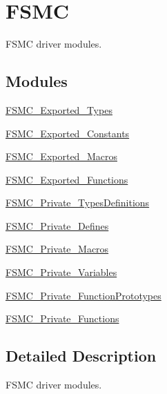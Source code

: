 \hypertarget{group___f_s_m_c}{}\section{F\+S\+MC}
\label{group___f_s_m_c}


F\+S\+MC driver modules.  


\subsection*{Modules}
\begin{DoxyCompactItemize}
\item 
\hyperlink{group___f_s_m_c___exported___types}{F\+S\+M\+C\+\_\+\+Exported\+\_\+\+Types}
\item 
\hyperlink{group___f_s_m_c___exported___constants}{F\+S\+M\+C\+\_\+\+Exported\+\_\+\+Constants}
\item 
\hyperlink{group___f_s_m_c___exported___macros}{F\+S\+M\+C\+\_\+\+Exported\+\_\+\+Macros}
\item 
\hyperlink{group___f_s_m_c___exported___functions}{F\+S\+M\+C\+\_\+\+Exported\+\_\+\+Functions}
\item 
\hyperlink{group___f_s_m_c___private___types_definitions}{F\+S\+M\+C\+\_\+\+Private\+\_\+\+Types\+Definitions}
\item 
\hyperlink{group___f_s_m_c___private___defines}{F\+S\+M\+C\+\_\+\+Private\+\_\+\+Defines}
\item 
\hyperlink{group___f_s_m_c___private___macros}{F\+S\+M\+C\+\_\+\+Private\+\_\+\+Macros}
\item 
\hyperlink{group___f_s_m_c___private___variables}{F\+S\+M\+C\+\_\+\+Private\+\_\+\+Variables}
\item 
\hyperlink{group___f_s_m_c___private___function_prototypes}{F\+S\+M\+C\+\_\+\+Private\+\_\+\+Function\+Prototypes}
\item 
\hyperlink{group___f_s_m_c___private___functions}{F\+S\+M\+C\+\_\+\+Private\+\_\+\+Functions}
\end{DoxyCompactItemize}


\subsection{Detailed Description}
F\+S\+MC driver modules. 

